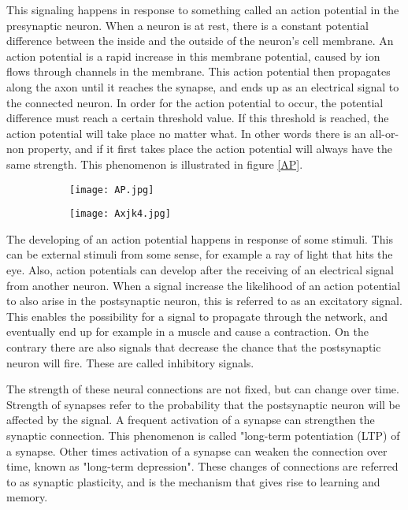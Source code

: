 This signaling happens in response to something called an action potential in the presynaptic neuron. When a neuron is at rest, there is a constant potential difference between the inside and the outside of the neuron's cell membrane. An action potential is a rapid increase in this membrane potential, caused by ion flows through channels in the membrane. This action potential then propagates along the axon until it reaches the synapse, and ends up as an electrical signal to the connected neuron. In order for the action potential to occur, the potential difference must reach a certain threshold value. If this threshold is reached, the action potential will take place no matter what. In other words there is an all-or-non property, and if it first takes place the action potential will always have the same strength. This phenomenon is illustrated in figure \ref{AP}.

\begin{figure}[h]
\caption{}
\label{AP}
\begin{subfigure}
\centering
\texttt{[image: AP.jpg]}
\end{subfigure}
\begin{subfigure}
\centering
\texttt{[image: Axjk4.jpg]}
\end{subfigure}
\end{figure} 

The developing of an action potential happens in response of some stimuli. This can be external stimuli from some sense, for example a ray of light that hits the eye. Also, action potentials can develop after the receiving of an electrical signal from another neuron. When a signal increase the likelihood of an action potential to also arise in the postsynaptic neuron, this is referred to as an excitatory signal. This enables the possibility for a signal to propagate through the network, and eventually end up for example in a muscle and cause a contraction. On the contrary there are also signals that decrease the chance that the postsynaptic neuron will fire. These are called inhibitory signals.

The  strength of these neural connections are not fixed, but can change over time. Strength of synapses refer to the probability that the postsynaptic neuron will be affected by the signal. A frequent activation of a synapse can strengthen the synaptic connection. This phenomenon is called "long-term potentiation (LTP) of a synapse. Other times activation of a synapse can weaken the connection over time, known as "long-term depression". These changes of connections are referred to as synaptic plasticity, and is the mechanism that gives rise to learning and memory. \\

